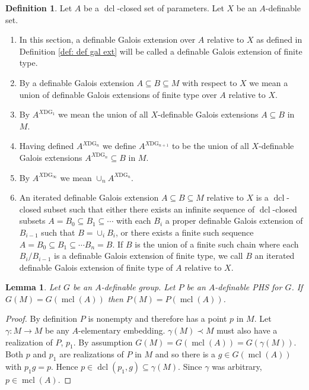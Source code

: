 \documentclass{amsart}
\newtheorem{lemma}[theorem]{Lemma}
\theoremstyle{definition}
\newtheorem{definition}[theorem]{Definition}
\theoremstyle{remark}
\numberwithin{equation}{section}
\def \mcl {\operatorname{mcl}}
\def \dcl {\operatorname{dcl}}
\begin{document}
\begin{definition}
    Let $A$ be a $\dcl$-closed set of parameters. Let $X$ be an $A$-definable set.  
    \begin{enumerate}
        \item In this section, a definable Galois extension over $A$ relative to $X$ as defined in Definition \ref{def: def gal ext} will be called a definable Galois extension of finite type. 
        \item By a definable Galois extension $A \subseteq B \subseteq M$ with respect to $X$ we mean a union of definable Galois extensions of finite type over $A$ relative to $X$. 
        \item By $A^{X\text{DG}_1}$ we mean the union of all $X$-definable Galois extensions $A\subseteq B$ in $M$.  
        \item Having defined $A^{X\text{DG}_n}$ we define $A^{X\text{DG}_{n+1}}$ to be the union of all $X$-definable Galois extensions $A^{X\text{DG}_n}\subseteq B$ in $M$.  
        \item By $A^{X\text{DG}_\infty}$ we mean $\cup_n A^{X\text{DG}_n}$.
        \item An iterated definable Galois extension $A \subseteq B \subseteq M$ relative to $X$ is a $\dcl$-closed subset such that either there exists an infinite sequence of $\dcl$-closed subsets $A=B_0 \subseteq B_1 \subseteq \cdots $ with each $B_i$ a proper definable Galois extension of $B_{i-1}$ such that $B= \cup_iB_i$, or there exists a finite such sequence $A=B_0 \subseteq B_1 \subseteq \cdots B_n=B$. If $B$ is the union of a finite such chain where each $B_i/B_{i-1}$ is a definable Galois extension of finite type, we call $B$ an iterated definable Galois extension of finite type of $A$ relative to $X$. 
    \end{enumerate}
\end{definition}




\begin{lemma}\label{lem: mcl points}
    Let $G$ be an $A$-definable group. Let $P$ be an $A$-definable PHS for $G$. If $G(M) = G(\mcl(A))$ then $P(M) = P(\mcl(A))$. 
\end{lemma}

\begin{proof}
    By definition $P$ is nonempty and therefore has a point $p$ in $M$. Let $\gamma:M \to M$ be any $A$-elementary embedding. $\gamma(M) \prec M$ must also have a realization of $P$, $p_1$. By assumption $G(M) = G(\mcl(A)) = G(\gamma(M))$. Both $p$ and $p_1$ are realizations of $P$ in $M$ and so there is a $g \in G(\mcl(A))$ with $p_1g = p$. Hence $p \in \dcl(p_1,g) \subseteq \gamma(M)$. Since $\gamma$ was arbitrary, $p \in \mcl(A)$.
\end{proof}
\end{document}
